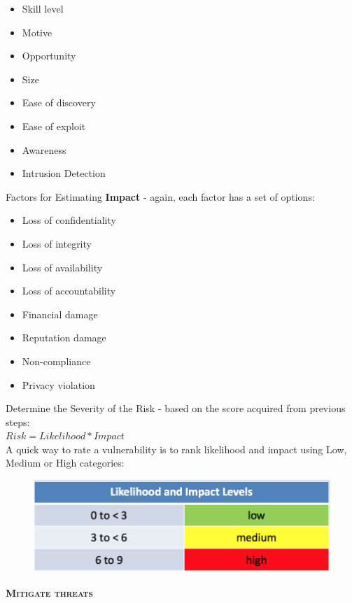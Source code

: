 \documentclass[a5paper,pagesize,10pt,bibtotoc,DIV=10,twoside]{scrbook}
\begin{document}
\begin{itemize}
\item Skill level
\item Motive
\item Opportunity
\item Size
\item Ease of discovery
\item Ease of exploit
\item Awareness
\item Intrusion Detection
\end{itemize}

Factors for Estimating \textbf{Impact} - again, each factor has a set of options:

\begin{itemize}
\item Loss of confidentiality
\item Loss of integrity
\item Loss of availability
\item Loss of accountability
\item Financial damage
\item Reputation damage
\item Non-compliance
\item Privacy violation
\end{itemize}

Determine the Severity of the Risk - based on the score acquired from previous steps:\\

$Risk = Likelihood * Impact$ \\
A quick way to rate a vulnerability is to rank likelihood and impact using Low, Medium or High categories: 
\begin{figure}[H]
\centering
\includegraphics[scale=0.7]{images/likelihood}
\end{figure}


\textsc{\textbf{Mitigate threats}}\\
\end{document}
